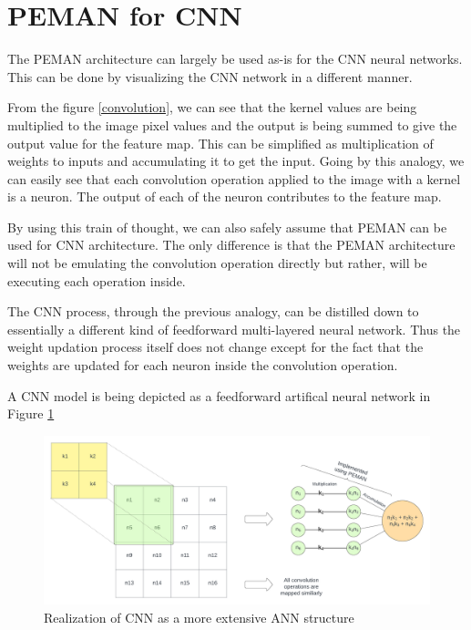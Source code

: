 \documentclass[wide]{adonis}
\begin{document}
\section{PEMAN for CNN}

The PEMAN architecture can largely be used as-is for the CNN neural networks. This can be done by visualizing the CNN network in a different manner.

From the figure \ref{convolution}, we can see that the kernel values are being multiplied to the image pixel values and the output is being summed to give the output value for the feature map. This can be simplified as multiplication of weights to inputs and accumulating it to get the input. Going by this analogy, we can easily see that each convolution operation applied to the image with a kernel is a neuron. The output of each of the neuron contributes to the feature map.

By using this train of thought, we can also safely assume that PEMAN can be used for CNN architecture. The only difference is that the PEMAN architecture will not be emulating the convolution operation directly but rather, will be executing each operation inside.

The CNN process, through the previous analogy, can be distilled down to essentially a different kind of feedforward multi-layered neural network. Thus the weight updation process itself does not change except for the fact that the weights are updated for each neuron inside the convolution operation.

A CNN model is being depicted as a feedforward artifical neural network in Figure \ref{cnn_as_ann}

\begin{figure}
	\centering
	\includegraphics[width=\textwidth]{images/cnn_as_ann3.png}
	\caption{Realization of CNN as a more extensive ANN structure}
	\label{cnn_as_ann}
\end{figure}
\end{document}
